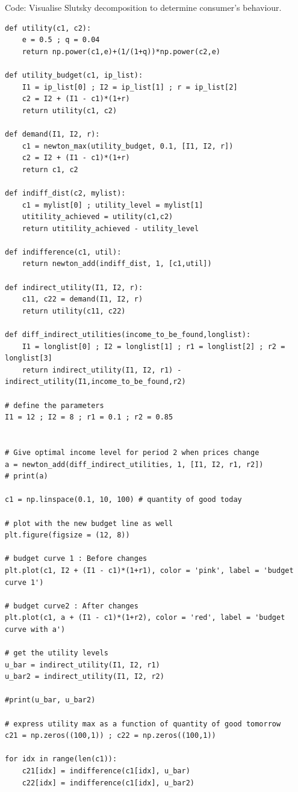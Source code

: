 \documentclass[a4paper, 12pt, reqno]{article}
\begin{document}
\hfill
Code: Visualise Slutsky decomposition to determine consumer's behaviour. 
\begin{lstlisting}[frame=single]
    def utility(c1, c2):
    e = 0.5 ; q = 0.04
    return np.power(c1,e)+(1/(1+q))*np.power(c2,e)

def utility_budget(c1, ip_list):
    I1 = ip_list[0] ; I2 = ip_list[1] ; r = ip_list[2]
    c2 = I2 + (I1 - c1)*(1+r)
    return utility(c1, c2)
    
def demand(I1, I2, r):
    c1 = newton_max(utility_budget, 0.1, [I1, I2, r])
    c2 = I2 + (I1 - c1)*(1+r)
    return c1, c2

def indiff_dist(c2, mylist): 
    c1 = mylist[0] ; utility_level = mylist[1]
    utitility_achieved = utility(c1,c2)
    return utitility_achieved - utility_level

def indifference(c1, util):
    return newton_add(indiff_dist, 1, [c1,util])

def indirect_utility(I1, I2, r):
    c11, c22 = demand(I1, I2, r)
    return utility(c11, c22)

def diff_indirect_utilities(income_to_be_found,longlist):
    I1 = longlist[0] ; I2 = longlist[1] ; r1 = longlist[2] ; r2 = longlist[3]
    return indirect_utility(I1, I2, r1) - indirect_utility(I1,income_to_be_found,r2)

# define the parameters
I1 = 12 ; I2 = 8 ; r1 = 0.1 ; r2 = 0.85


# Give optimal income level for period 2 when prices change
a = newton_add(diff_indirect_utilities, 1, [I1, I2, r1, r2])
# print(a)

c1 = np.linspace(0.1, 10, 100) # quantity of good today

# plot with the new budget line as well
plt.figure(figsize = (12, 8))

# budget curve 1 : Before changes
plt.plot(c1, I2 + (I1 - c1)*(1+r1), color = 'pink', label = 'budget curve 1')

# budget curve2 : After changes
plt.plot(c1, a + (I1 - c1)*(1+r2), color = 'red', label = 'budget curve with a')

# get the utility levels
u_bar = indirect_utility(I1, I2, r1) 
u_bar2 = indirect_utility(I1, I2, r2)

#print(u_bar, u_bar2)

# express utility max as a function of quantity of good tomorrow
c21 = np.zeros((100,1)) ; c22 = np.zeros((100,1))

for idx in range(len(c1)):
    c21[idx] = indifference(c1[idx], u_bar)
    c22[idx] = indifference(c1[idx], u_bar2)


\end{lstlisting}
\end{document}
